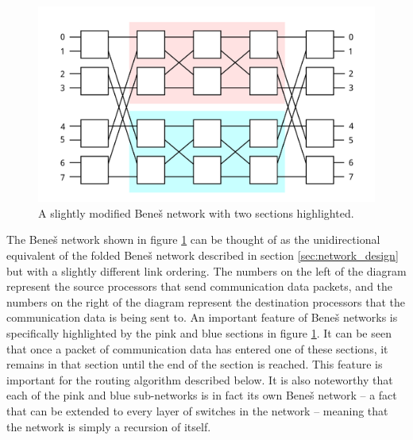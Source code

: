 \documentclass[a4paper, 12pt]{article}
\begin{document}
\begin{figure}[H]
\centering
\includegraphics[width=\textwidth]{benes_sectioned.png}
\caption[A slightly modified Bene\v{s} network with two sections highlighted]{A slightly modified Bene\v{s} network with two sections highlighted.}
\label{fig:benes_sectioned}
\end{figure}

The Bene\v{s} network shown in figure \ref{fig:benes_sectioned} can be thought of as the unidirectional equivalent of the folded Bene\v{s} network described in section \ref{sec:network_design} but with a slightly different link ordering. The numbers on the left of the diagram represent the source processors that send communication data packets, and the numbers on the right of the diagram represent the destination processors that the communication data is being sent to. An important feature of Bene\v{s} networks is specifically highlighted by the pink and blue sections in figure \ref{fig:benes_sectioned}. It can be seen that once a packet of communication data has entered one of these sections, it remains in that section until the end of the section is reached. This feature is important for the routing algorithm described below. It is also noteworthy that each of the pink and blue sub-networks is in fact its own Bene\v{s} network -- a fact that can be extended to every layer of switches in the network -- meaning that the network is simply a recursion of itself.
\end{document}
